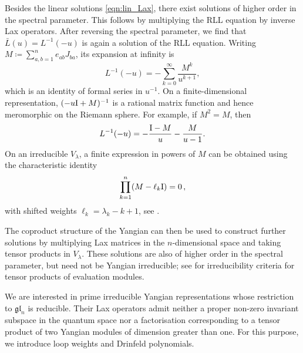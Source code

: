 \documentclass[12pt,reqno]{amsart}
\newcommand{\id}{{\rm I}}
\numberwithin{equation}{section}
\begin{document}
Besides the linear solutions \eqref{eqn:lin_Lax}, there exist solutions of higher order in the spectral parameter. This follows by multiplying the RLL equation by inverse Lax operators. After reversing the spectral parameter, we find that $\bar L(u)=L^{-1}(-u)$ is again a solution of the RLL equation. Writing $M\coloneqq\sum_{a,b=1}^n e_{ab}J_{ba}$, its expansion at infinity is
	\begin{equation}
		L^{-1}(-u)= -\sum_{k=0}^{\infty}\frac{M^k}{u^{k+1}},
	\end{equation}
	which is an identity of formal series in $u^{-1}$. On a
    finite-dimensional representation,
    $(-u\id+M)^{-1}$ is a rational matrix function and hence meromorphic
    on the Riemann sphere. For example, if $M^2=M$, then
    \begin{equation*}
        L^{-1}(-u)=-\frac{\id-M}{u}-\frac{M}{u-1}.
    \end{equation*}
    On an irreducible $V_\lambda$, a finite expression in powers of $M$
    can be obtained using the characteristic identity
	\begin{equation}
	 \prod_{k=1}^n (M-\ell_k \id)=0\,,
	\end{equation}
	with shifted weights $\ell_k=\lambda_k-k+1$, see \cite{Green:1971rp}.

The coproduct structure of the Yangian can then be used to construct further solutions by multiplying Lax matrices in the $n$-dimensional space and taking tensor products in $V_\lambda$. These solutions are also of higher order in the spectral parameter, but need not be Yangian irreducible; see \cite{Molev00} for irreducibility criteria for tensor products of evaluation modules.


We are interested in prime irreducible Yangian representations whose
restriction to $\mathfrak{gl}_n$ is reducible. Their Lax operators admit
neither a proper non-zero invariant subspace in the quantum space nor a
factorisation corresponding to a tensor product of two Yangian modules
of dimension greater than one.
For this purpose, we introduce loop weights and Drinfeld polynomials.
\end{document}
